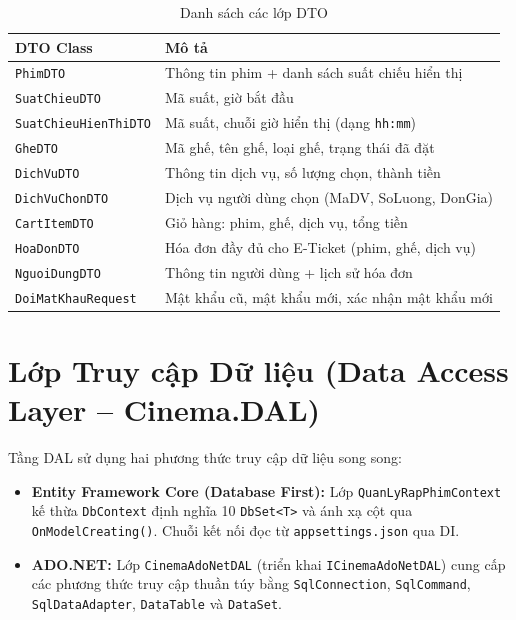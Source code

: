 \documentclass[12pt,a4paper,oneside]{book}
\theoremstyle{plain}
\numberwithin{equation}{chapter}
\begin{document}
\begin{table}[H]
    \begin{center}
        \begin{tabular}{|l|l|}
            \hline
            \textbf{DTO Class} & \textbf{Mô tả} \\
            \hline
            \texttt{PhimDTO}            & Thông tin phim + danh sách suất chiếu hiển thị \\
            \hline
            \texttt{SuatChieuDTO}       & Mã suất, giờ bắt đầu \\
            \hline
            \texttt{SuatChieuHienThiDTO} & Mã suất, chuỗi giờ hiển thị (dạng \texttt{hh:mm}) \\
            \hline
            \texttt{GheDTO}             & Mã ghế, tên ghế, loại ghế, trạng thái đã đặt \\
            \hline
            \texttt{DichVuDTO}          & Thông tin dịch vụ, số lượng chọn, thành tiền \\
            \hline
            \texttt{DichVuChonDTO}      & Dịch vụ người dùng chọn (MaDV, SoLuong, DonGia) \\
            \hline
            \texttt{CartItemDTO}        & Giỏ hàng: phim, ghế, dịch vụ, tổng tiền \\
            \hline
            \texttt{HoaDonDTO}          & Hóa đơn đầy đủ cho E-Ticket (phim, ghế, dịch vụ) \\
            \hline
            \texttt{NguoiDungDTO}       & Thông tin người dùng + lịch sử hóa đơn \\
            \hline
            \texttt{DoiMatKhauRequest}  & Mật khẩu cũ, mật khẩu mới, xác nhận mật khẩu mới \\
            \hline
        \end{tabular}
    \end{center}
    \caption{Danh sách các lớp DTO}\label{table_dto}
\end{table}

\section{Lớp Truy cập Dữ liệu (Data Access Layer -- Cinema.DAL)}\label{Sec3.4}

\noindent Tầng DAL sử dụng hai phương thức truy cập dữ liệu song song:

\begin{itemize}
    \item \textbf{Entity Framework Core (Database First):} Lớp \texttt{QuanLyRapPhimContext} kế thừa \texttt{DbContext} định nghĩa 10 \texttt{DbSet<T>} và ánh xạ cột qua \texttt{OnModelCreating()}. Chuỗi kết nối đọc từ \texttt{appsettings.json} qua DI.
    \item \textbf{ADO.NET:} Lớp \texttt{CinemaAdoNetDAL} (triển khai \texttt{ICinemaAdoNetDAL}) cung cấp các phương thức truy cập thuần túy bằng \texttt{SqlConnection}, \texttt{SqlCommand}, \texttt{SqlDataAdapter}, \texttt{DataTable} và \texttt{DataSet}.
\end{itemize}
\end{document}
